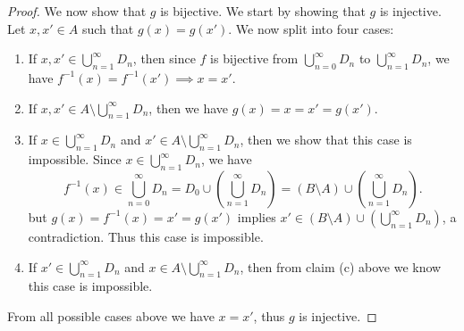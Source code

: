\begin{proof}
    We now show that \(g\) is bijective.
    We start by showing that \(g\) is injective.
    Let \(x, x' \in A\) such that \(g(x) = g(x')\).
    We now split into four cases:
    \begin{enumerate}
        \item If \(x, x' \in \bigcup_{n = 1}^\infty D_n\), then since \(f\) is bijective from \(\bigcup_{n = 0}^\infty D_n\) to \(\bigcup_{n = 1}^\infty D_n\), we have \(f^{-1}(x) = f^{-1}(x') \implies x = x'\).
        \item If \(x, x' \in A \setminus \bigcup_{n = 1}^\infty D_n\), then we have \(g(x) = x = x' = g(x')\).
        \item If \(x \in \bigcup_{n = 1}^\infty D_n\) and \(x' \in A \setminus \bigcup_{n = 1}^\infty D_n\), then we show that this case is impossible.
              Since \(x \in \bigcup_{n = 1}^\infty D_n\), we have
              \[
                  f^{-1}(x) \in \bigcup_{n = 0}^\infty D_n = D_0 \cup (\bigcup_{n = 1}^\infty D_n) = (B \setminus A) \cup (\bigcup_{n = 1}^\infty D_n).
              \]
              but \(g(x) = f^{-1}(x) = x' = g(x')\) implies \(x' \in (B \setminus A) \cup (\bigcup_{n = 1}^\infty D_n)\), a contradiction.
              Thus this case is impossible.
        \item If \(x' \in \bigcup_{n = 1}^\infty D_n\) and \(x \in A \setminus \bigcup_{n = 1}^\infty D_n\), then from claim (c) above we know this case is impossible.
    \end{enumerate}
    From all possible cases above we have \(x = x'\), thus \(g\) is injective.


\end{proof}

